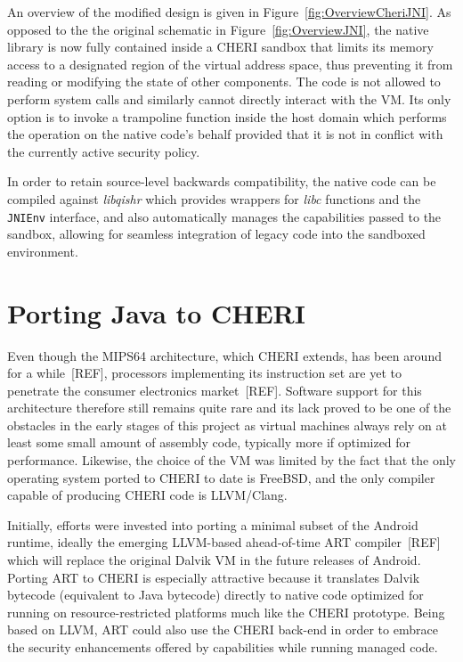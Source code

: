 \documentclass[a4paper,12pt,twoside,openright]{report}
\newcommand{\tool}[1]{\emph{#1}}
\newcommand{\lib}[1]{\tool{lib#1}}
\begin{document}
An overview of the modified design is given in Figure~\ref{fig:OverviewCheriJNI}. As opposed to the the original schematic in Figure~\ref{fig:OverviewJNI}, the native library is now fully contained inside a CHERI sandbox that limits its memory access to a designated region of the virtual address space, thus preventing it from reading or modifying the state of other components. The code is not allowed to perform system calls and similarly cannot directly interact with the VM. Its only option is to invoke a trampoline function inside the host domain which performs the operation on the native code's behalf provided that it is not in conflict with the currently active security policy.

In order to retain source-level backwards compatibility, the native code can be compiled against \lib{qishr} which provides wrappers for \lib{c} functions and the \texttt{JNIEnv} interface, and also automatically manages the capabilities passed to the sandbox, allowing for seamless integration of legacy code into the sandboxed environment.

\section{Porting Java to CHERI}

Even though the MIPS64 architecture, which CHERI extends, has been around for a while~[REF], processors implementing its instruction set are yet to penetrate the consumer electronics market~[REF]. Software support for this architecture therefore still remains quite rare and its lack proved to be one of the obstacles in the early stages of this project as virtual machines always rely on at least some small amount of assembly code, typically more if optimized for performance. Likewise, the choice of the VM was limited by the fact that the only operating system ported to CHERI to date is FreeBSD, and the only compiler capable of producing CHERI code is LLVM/Clang. 

Initially, efforts were invested into porting a minimal subset of the Android runtime, ideally the emerging LLVM-based ahead-of-time ART compiler~[REF] which will replace the original Dalvik VM in the future releases of Android. Porting ART to CHERI is especially attractive because it translates Dalvik bytecode (equivalent to Java bytecode) directly to native code optimized for running on resource-restricted platforms much like the CHERI prototype. Being based on LLVM, ART could also use the CHERI back-end in order to embrace the security enhancements offered by capabilities while running managed code.
\end{document}
